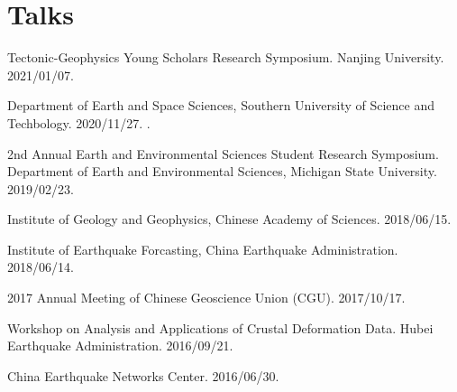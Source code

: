 \section{Talks}

\begin{etaremune}
\item
	Tectonic-Geophysics Young Scholars Research Symposium.
	Nanjing University.
	2021/01/07.
\item
	Department of Earth and Space Sciences, Southern University of Science and Techbology.
	2020/11/27.
	\invited.
\item
    2nd Annual Earth and Environmental Sciences Student Research Symposium.
    Department of Earth and Environmental Sciences, Michigan State University.
    2019/02/23.
\item
    Institute of Geology and Geophysics, Chinese Academy of Sciences.
    2018/06/15.
    \invited
\item
    Institute of Earthquake Forcasting, China Earthquake Administration.
    2018/06/14.
\item
    2017 Annual Meeting of Chinese Geoscience Union (CGU).
    2017/10/17.
    \invited
\item
    Workshop on Analysis and Applications of Crustal Deformation Data.
    Hubei Earthquake Administration.
    2016/09/21.
    \invited
\item
    China Earthquake Networks Center.
    2016/06/30.
    \invited
\end{etaremune}
